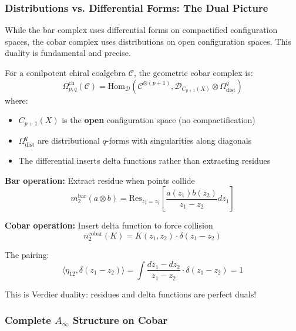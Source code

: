 \subsubsection{Distributions vs. Differential Forms: The Dual Picture}

While the bar complex uses differential forms on compactified configuration spaces, the cobar complex uses distributions on open configuration spaces. This duality is fundamental and precise.

\begin{definition}\label{def:geom-cobar-precise}
For a conilpotent chiral coalgebra $\mathcal{C}$, the geometric cobar complex is:
$$\Omega^{\text{ch}}_{p,q}(\mathcal{C}) = \text{Hom}_{\mathcal{D}}\left(\mathcal{C}^{\otimes(p+1)}, \mathcal{D}_{C_{p+1}(X)} \otimes \Omega^q_{\text{dist}}\right)$$
where:
\begin{itemize}
\item $C_{p+1}(X)$ is the \textbf{open} configuration space (no compactification)
\item $\Omega^q_{\text{dist}}$ are distributional $q$-forms with singularities along diagonals
\item The differential inserts delta functions rather than extracting residues
\end{itemize}
\end{definition}

\begin{example}
\textbf{Bar operation:} Extract residue when points collide
$$m_2^{\text{bar}}(a \otimes b) = \text{Res}_{z_1=z_2}\left[\frac{a(z_1)b(z_2)}{z_1-z_2}dz_1\right]$$

\textbf{Cobar operation:} Insert delta function to force collision
$$n_2^{\text{cobar}}(K) = K(z_1,z_2) \cdot \delta(z_1-z_2)$$

The pairing:
$$\langle \eta_{12}, \delta(z_1-z_2) \rangle = \int \frac{dz_1-dz_2}{z_1-z_2} \cdot \delta(z_1-z_2) = 1$$

This is Verdier duality: residues and delta functions are perfect duals!
\end{example}

\subsubsection{Complete $A_\infty$ Structure on Cobar}

